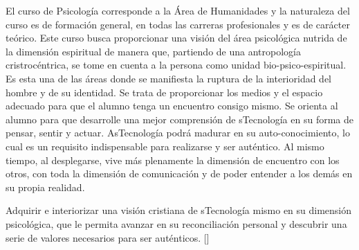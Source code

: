 \begin{syllabus}


\begin{justification}
El curso de Psicología corresponde a la Área de Humanidades y la naturaleza del curso es de formación general, en todas las carreras profesionales y es de carácter teórico.
Este curso busca proporcionar una visión del área psicológica nutrida de la dimensión espiritual de manera que, partiendo de una antropología cristrocéntrica, se tome en cuenta a la persona como unidad bio-psico-espiritual. Es esta una de las áreas donde se manifiesta la ruptura de la interioridad del hombre y de su identidad.
Se trata de proporcionar los medios y el espacio adecuado para que el alumno tenga un encuentro consigo mismo. Se orienta al alumno para que desarrolle una mejor comprensión de sTecnología en su forma de pensar, sentir y actuar. AsTecnología podrá madurar en su auto-conocimiento, lo cual es un requisito indispensable para realizarse y ser auténtico. Al mismo tiempo, al desplegarse, vive más plenamente la dimensión de encuentro con los otros, con toda la dimensión de comunicación y de poder entender a los demás en su propia realidad.
\end{justification}

\begin{goals}
\item Adquirir e interiorizar una visión cristiana de sTecnología mismo en su dimensión psicológica, que le permita avanzar en su reconciliación personal y descubrir una serie de valores necesarios para ser auténticos. [\Usage]
\end{goals}

\begin{outcomes}
    \item {}
    \item {}
    \item {}
    \item {}
\end{outcomes}

\begin{competences}
    \item {}
    \item {}
    \item {} 
    \item {}
\end{competences}


\end{syllabus}

